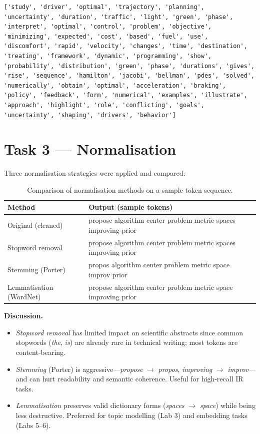 \documentclass[10pt,a4paper]{article}
\begin{document}
\begin{lstlisting}[language={}, caption={After cleaning and tokenisation (stopwords retained).}]
['study', 'driver', 'optimal', 'trajectory', 'planning', 'uncertainty', 'duration', 'traffic', 'light', 'green', 'phase', 'interpret', 'optimal', 'control', 'problem', 'objective', 'minimizing', 'expected', 'cost', 'based', 'fuel', 'use', 'discomfort', 'rapid', 'velocity', 'changes', 'time', 'destination', 'treating', 'framework', 'dynamic', 'programming', 'show', 'probability', 'distribution', 'green', 'phase', 'durations', 'gives', 'rise', 'sequence', 'hamilton', 'jacobi', 'bellman', 'pdes', 'solved', 'numerically', 'obtain', 'optimal', 'acceleration', 'braking', 'policy', 'feedback', 'form', 'numerical', 'examples', 'illustrate', 'approach', 'highlight', 'role', 'conflicting', 'goals', 'uncertainty', 'shaping', 'drivers', 'behavior']
\end{lstlisting}

\section{Task 3 --- Normalisation}

Three normalisation strategies were applied and compared:

\begin{table}[H]
\centering
\caption{Comparison of normalisation methods on a sample token sequence.}
\begin{tabularx}{\linewidth}{lX}
\toprule
\textbf{Method} & \textbf{Output (sample tokens)} \\
\midrule
Original (cleaned)     & propose algorithm center problem metric spaces improving prior \\
Stopword removal       & propose algorithm center problem metric spaces improving prior \\
Stemming (Porter)      & propos algorithm center problem metric space improv prior \\
Lemmatisation (WordNet) & propose algorithm center problem metric space improving prior \\
\bottomrule
\end{tabularx}
\end{table}

\textbf{Discussion.}

\begin{itemize}[leftmargin=*]
    \item \textit{Stopword removal} has limited impact on scientific abstracts since common stopwords (\emph{the}, \emph{is}) are already rare in technical writing; most tokens are content-bearing.
    \item \textit{Stemming} (Porter) is aggressive---\emph{propose} $\to$ \emph{propos}, \emph{improving} $\to$ \emph{improv}---and can hurt readability and semantic coherence. Useful for high-recall IR tasks.
    \item \textit{Lemmatisation} preserves valid dictionary forms (\emph{spaces} $\to$ \emph{space}) while being less destructive. Preferred for topic modelling (Lab 3) and embedding tasks (Labs 5--6).
\end{itemize}
\end{document}
